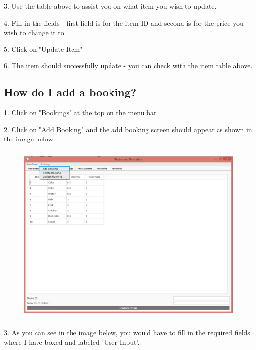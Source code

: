 3. Use the table above to assist you on what item you wish to update.

4. Fill in the fields - first field is for the item ID and second is for the price you wish to change it to

5. Click on "Update Item"

6. The item should successfully update - you can check with the item table above.

\newpage
\subsection{How do I add a booking?}
1. Click on "Bookings" at the top on the menu bar

2. Click on "Add Booking" and the add booking screen should appear as shown in the image below.

\begin{figure}[H]
    \includegraphics[height = 9cm]{./Manual/images/AddBooking1} 
    \caption{} \label{fig:addbooking1}
\end{figure}

3. As you can see in the image below, you would have to fill in the required fields where I have boxed and labeled 'User Input'.

